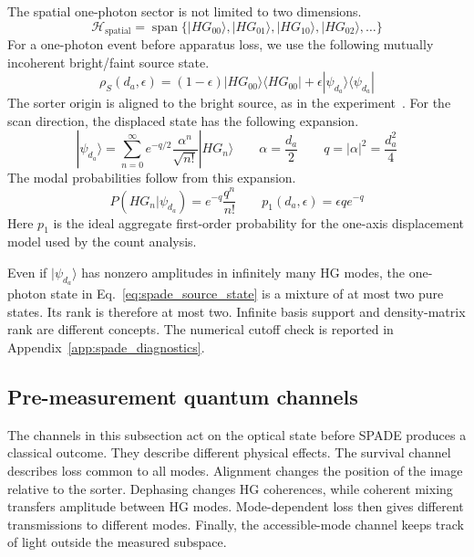 The spatial one-photon sector is not limited to two dimensions.
\begin{equation}
    \mathcal{H}_{\mathrm{spatial}}
    =\operatorname{span}\{|HG_{00}\rangle,|HG_{01}\rangle,|HG_{10}\rangle,|HG_{02}\rangle,\ldots\}
    \label{eq:spade_infinite_hg_space}
\end{equation}
For a one-photon event before apparatus loss, we use the following mutually incoherent bright/faint source state.
\begin{equation}
    \rho_S(d_a,\epsilon)
    =(1-\epsilon)|HG_{00}\rangle\langle HG_{00}|
    +\epsilon|\psi_{d_a}\rangle\langle\psi_{d_a}|
    \label{eq:spade_source_state}
\end{equation}
The sorter origin is aligned to the bright source, as in the experiment~\cite{Santamaria2024single}.  For the scan direction, the displaced state has the following expansion.
\begin{equation}
    |\psi_{d_a}\rangle
    =\sum_{n=0}^{\infty}e^{-q/2}\frac{\alpha^n}{\sqrt{n!}}|HG_n\rangle
    \qquad
    \alpha=\frac{d_a}{2}
    \qquad
    q=|\alpha|^2=\frac{d_a^2}{4}
    \label{eq:spade_effective_coordinates}
\end{equation}
The modal probabilities follow from this expansion.
\begin{equation}
    P(HG_n|\psi_{d_a})=e^{-q}\frac{q^n}{n!}
    \qquad
    p_1(d_a,\epsilon)=\epsilon q e^{-q}
    \label{eq:spade_sector_probabilities}
\end{equation}
Here $p_1$ is the ideal aggregate first-order probability for the one-axis displacement model used by the count analysis.

Even if $|\psi_{d_a}\rangle$ has nonzero amplitudes in infinitely many HG modes, the one-photon state in Eq.~\eqref{eq:spade_source_state} is a mixture of at most two pure states.  Its rank is therefore at most two.  Infinite basis support and density-matrix rank are different concepts.  The numerical cutoff check is reported in Appendix~\ref{app:spade_diagnostics}.

\subsection{Pre-measurement quantum channels}

The channels in this subsection act on the optical state before SPADE produces a classical outcome.  They describe different physical effects.  The survival channel describes loss common to all modes.  Alignment changes the position of the image relative to the sorter.  Dephasing changes HG coherences, while coherent mixing transfers amplitude between HG modes.  Mode-dependent loss then gives different transmissions to different modes.  Finally, the accessible-mode channel keeps track of light outside the measured subspace.

